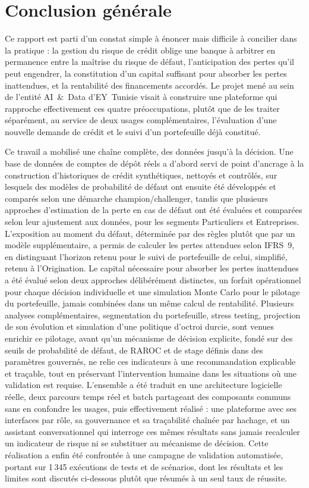 \chapter*{Conclusion générale}

Ce rapport est parti d'un constat simple à énoncer mais difficile à concilier dans la pratique : la gestion du risque de crédit oblige une banque à arbitrer en permanence entre la maîtrise du risque de défaut, l'anticipation des pertes qu'il peut engendrer, la constitution d'un capital suffisant pour absorber les pertes inattendues, et la rentabilité des financements accordés. Le projet mené au sein de l'entité AI~\&~Data d'EY~Tunisie visait à construire une plateforme qui rapproche effectivement ces quatre préoccupations, plutôt que de les traiter séparément, au service de deux usages complémentaires, l'évaluation d'une nouvelle demande de crédit et le suivi d'un portefeuille déjà constitué.

Ce travail a mobilisé une chaîne complète, des données jusqu'à la décision. Une base de données de comptes de dépôt réels a d'abord servi de point d'ancrage à la construction d'historiques de crédit synthétiques, nettoyés et contrôlés, sur lesquels des modèles de probabilité de défaut ont ensuite été développés et comparés selon une démarche champion/challenger, tandis que plusieurs approches d'estimation de la perte en cas de défaut ont été évaluées et comparées selon leur ajustement aux données, pour les segments Particuliers et Entreprises. L'exposition au moment du défaut, déterminée par des règles plutôt que par un modèle supplémentaire, a permis de calculer les pertes attendues selon IFRS~9, en distinguant l'horizon retenu pour le suivi de portefeuille de celui, simplifié, retenu à l'Origination. Le capital nécessaire pour absorber les pertes inattendues a été évalué selon deux approches délibérément distinctes, un forfait opérationnel pour chaque décision individuelle et une simulation Monte Carlo pour le pilotage du portefeuille, jamais combinées dans un même calcul de rentabilité. Plusieurs analyses complémentaires, segmentation du portefeuille, stress testing, projection de son évolution et simulation d'une politique d'octroi durcie, sont venues enrichir ce pilotage, avant qu'un mécanisme de décision explicite, fondé sur des seuils de probabilité de défaut, de RAROC et de stage définis dans des paramètres gouvernés, ne relie ces indicateurs à une recommandation explicable et traçable, tout en préservant l'intervention humaine dans les situations où une validation est requise. L'ensemble a été traduit en une architecture logicielle réelle, deux parcours temps réel et batch partageant des composants communs sans en confondre les usages, puis effectivement réalisé : une plateforme avec ses interfaces par rôle, sa gouvernance et sa traçabilité chaînée par hachage, et un assistant conversationnel qui interroge ces mêmes résultats sans jamais recalculer un indicateur de risque ni se substituer au mécanisme de décision. Cette réalisation a enfin été confrontée à une campagne de validation automatisée, portant sur 1\,345 exécutions de tests et de scénarios, dont les résultats et les limites sont discutés ci-dessous plutôt que résumés à un seul taux de réussite.

